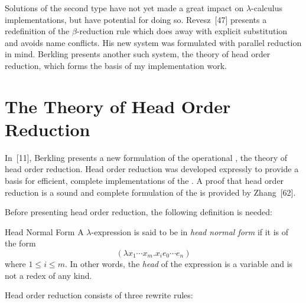 Solutions of the second type have not yet made a great impact on
\(\lambda\)-calculus implementations, but have potential for doing so.
Revesz~[47] presents a redefinition of the \(\beta\)-reduction rule which does
away with explicit substitution and avoids name conflicts. His new system was
formulated with parallel reduction in mind. Berkling presents another such
system, the theory of head order reduction, which forms the basis of my
implementation work.

\section{The Theory of Head Order Reduction}

In~[11], Berkling presents a new formulation of the operational
\lambdacalculus, the theory of head order reduction. Head order reduction was
developed expressly to provide a basis for efficient, complete implementations
of the \lambdacalculus. A proof that head order reduction is a sound and
complete formulation of the \lambdacalculus{} is provided by Zhang~[62].

\par\smallskip\noindent\begin{minipage}{\linewidth}
Before presenting head order reduction, the following definition is needed:

\begin{insetdefinition}{Head Normal Form}
A \(\lambda\)-expression is said to be in \emph{head normal form} if it is of
the form
\[
(\lambda x_1\cdots x_m.x_i e_0\cdots e_n)
\]
where \(1 \le i \le m\). In other words, the \emph{head} of the expression is a
variable and is not a redex of any kind.
\end{insetdefinition}
\end{minipage}\par\smallskip

Head order reduction consists of three rewrite rules:

